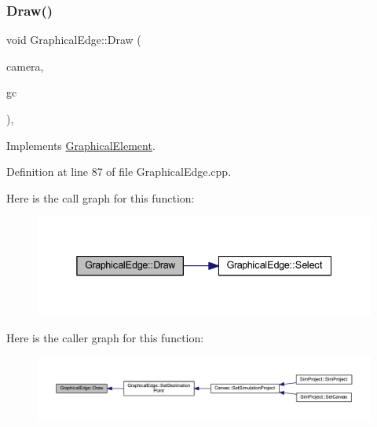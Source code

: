 \subsubsection{\texorpdfstring{Draw()}{Draw()}}
{\footnotesize\ttfamily void Graphical\+Edge\+::\+Draw (\begin{DoxyParamCaption}\item[{const wx\+Affine\+Matrix2D \&}]{camera,  }\item[{wx\+Graphics\+Context $\ast$}]{gc }\end{DoxyParamCaption})\hspace{0.3cm}{\ttfamily [override]}, {\ttfamily [virtual]}}



Implements \hyperlink{class_graphical_element_ab137d6d3ad82fd08b5610519dda0c600}{Graphical\+Element}.



Definition at line 87 of file Graphical\+Edge.\+cpp.

Here is the call graph for this function\+:
\nopagebreak
\begin{figure}[H]
\begin{center}
\leavevmode
\includegraphics[width=338pt]{class_graphical_edge_a48170a7fc9e86d92985d694addca8837_cgraph}
\end{center}
\end{figure}
Here is the caller graph for this function\+:
\nopagebreak
\begin{figure}[H]
\begin{center}
\leavevmode
\includegraphics[width=350pt]{class_graphical_edge_a48170a7fc9e86d92985d694addca8837_icgraph}
\end{center}
\end{figure}
\mbox{\label{class_graphical_edge_aaf19f4b4688b5eb5df39be7af1d09b4b}} 
